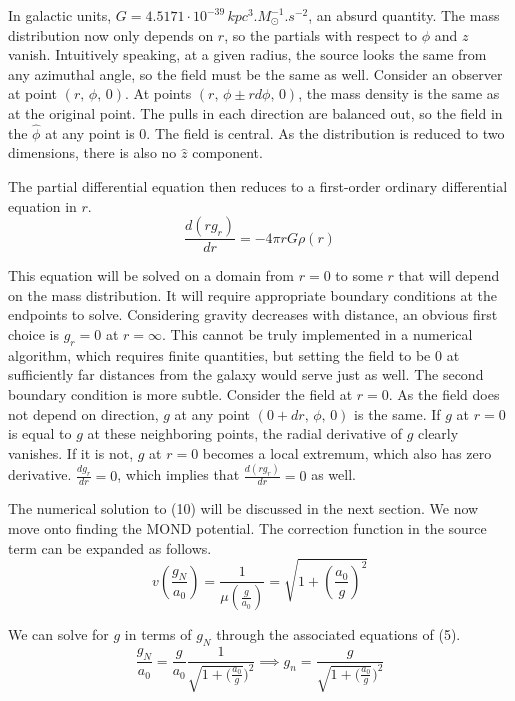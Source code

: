 \documentclass[11pt, twocolumn]{article}
\newcommand{\ff}[2]{\frac{#1}{#2}}
\newcommand{\df}[2]{\ff{d #1}{d #2}}
\begin{document}
    In galactic units, $G = 4.5171\cdot 10^{-39} \, \si{kpc^3.M_\odot^{-1}.s^{-2}}$, an absurd quantity. The mass distribution now only depends on $r$, so the partials with respect to $\phi$ and $z$ vanish. Intuitively speaking, at a given radius, the source looks the same from any azimuthal angle, so the field must be the same as well. Consider an observer at  point $(r, \, \phi, \, 0)$. At points $(r, \, \phi \pm rd\phi, \, 0)$, the mass density is the same as at the original point. The pulls in each direction are balanced out, so the field in the $\hat{\phi}$ at any point is $0$. The field is central. As the distribution is reduced to two dimensions, there is also no $\hat{z}$ component. 

    The partial differential equation then reduces to a first-order ordinary differential equation in $r$.
    \begin{equation}
    \df{(rg_r)}{r} = -4\pi rG\rho (r)
    \end{equation}
    
    This equation will be solved on a domain from $r = 0$ to some $r$ that will depend on the mass distribution. It will require appropriate boundary conditions at the endpoints to solve. Considering gravity decreases with distance, an obvious first choice is $g_r = 0$ at $r = \infty$. This cannot be truly implemented in a numerical algorithm, which requires finite quantities, but setting the field to be $0$ at sufficiently far distances from the galaxy would serve just as well. The second boundary condition is more subtle. Consider the field at $r = 0$. As the field does not depend on direction, $g$ at any point $(0 + dr, \, \phi, \, 0)$ is the same. If $g$ at $r = 0$ is equal to $g$ at these neighboring points, the radial derivative of $g$ clearly vanishes. If it is not, $g$ at $r = 0$ becomes a local extremum, which also has zero derivative. $\df{g_r}{r} = 0$, which implies that $\df{(rg_r)}{r} = 0$ as well.

    The numerical solution to (10) will be discussed in the next section. We now move onto finding the MOND potential. The correction function in the source term can be expanded as follows.
    \begin{equation}
    v(\frac{g_N}{a_0}) = \frac{1}{\mu(\frac{g}{a_0})} = \sqrt{1 + (\frac{a_0}{g})^2}
    \end{equation}
    
    We can solve for $g$ in terms of $g_N$ through the associated equations of (5).
    \begin{equation}
    \frac{g_N}{a_0} = \frac{g}{a_0}\frac{1}{\sqrt{1 + (\frac{a_0}{g}})^2} \implies g_n = \frac{g}{\sqrt{1 + (\frac{a_0}{g}})^2}
    \end{equation}
    
\end{document}

